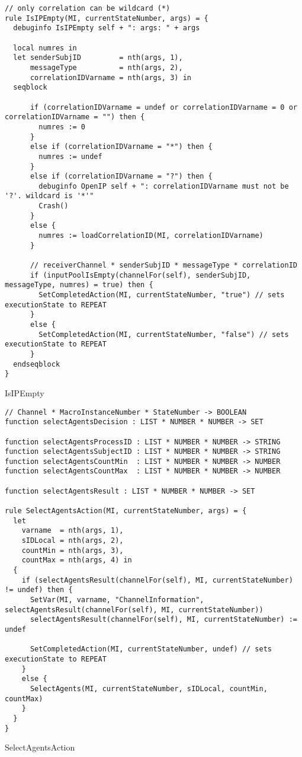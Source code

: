 \begin{listing}[H]
\begin{verbatim}
// only correlation can be wildcard (*)
rule IsIPEmpty(MI, currentStateNumber, args) = {
  debuginfo IsIPEmpty self + ": args: " + args

  local numres in
  let senderSubjID         = nth(args, 1),
      messageType          = nth(args, 2),
      correlationIDVarname = nth(args, 3) in
  seqblock

      if (correlationIDVarname = undef or correlationIDVarname = 0 or correlationIDVarname = "") then {
        numres := 0
      }
      else if (correlationIDVarname = "*") then {
        numres := undef
      }
      else if (correlationIDVarname = "?") then {
        debuginfo OpenIP self + ": correlationIDVarname must not be '?'. wildcard is '*'"
        Crash()
      }
      else {
        numres := loadCorrelationID(MI, correlationIDVarname)
      }

      // receiverChannel * senderSubjID * messageType * correlationID
      if (inputPoolIsEmpty(channelFor(self), senderSubjID, messageType, numres) = true) then {
        SetCompletedAction(MI, currentStateNumber, "true") // sets executionState to REPEAT
      }
      else {
        SetCompletedAction(MI, currentStateNumber, "false") // sets executionState to REPEAT
      }
  endseqblock
}
\end{verbatim}
\caption{IsIPEmpty}
\label{lst:asm:IsIPEmpty}
\end{listing}




\begin{listing}[H]
\begin{verbatim}
// Channel * MacroInstanceNumber * StateNumber -> BOOLEAN
function selectAgentsDecision : LIST * NUMBER * NUMBER -> SET

function selectAgentsProcessID : LIST * NUMBER * NUMBER -> STRING
function selectAgentsSubjectID : LIST * NUMBER * NUMBER -> STRING
function selectAgentsCountMin  : LIST * NUMBER * NUMBER -> NUMBER
function selectAgentsCountMax  : LIST * NUMBER * NUMBER -> NUMBER

function selectAgentsResult : LIST * NUMBER * NUMBER -> SET

rule SelectAgentsAction(MI, currentStateNumber, args) = {
  let
    varname  = nth(args, 1),
    sIDLocal = nth(args, 2),
    countMin = nth(args, 3),
    countMax = nth(args, 4) in
  {
    if (selectAgentsResult(channelFor(self), MI, currentStateNumber) != undef) then {
      SetVar(MI, varname, "ChannelInformation", selectAgentsResult(channelFor(self), MI, currentStateNumber))
      selectAgentsResult(channelFor(self), MI, currentStateNumber) := undef

      SetCompletedAction(MI, currentStateNumber, undef) // sets executionState to REPEAT
    }
    else {
      SelectAgents(MI, currentStateNumber, sIDLocal, countMin, countMax)
    }
  }
}
\end{verbatim}
\caption{SelectAgentsAction}
\label{lst:asm:SelectAgentsAction}
\end{listing}




